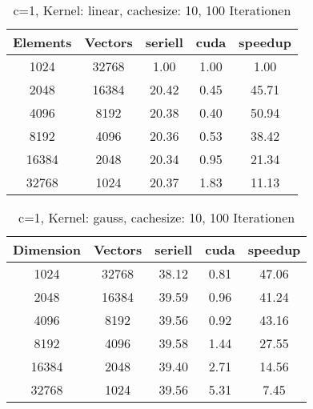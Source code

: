 \documentclass{scrartcl}
\begin{document}
\begin{table}
\begin{center}
\begin{tabular}{|c|c|c|c|c|}
\hline
Elements & Vectors & seriell & cuda & speedup \\
\hline
1024 & 32768 & 1.00 & 1.00 & 1.00 \\
2048 & 16384 & 20.42 & 0.45 & 45.71 \\
4096 & 8192 & 20.38 & 0.40 & 50.94 \\
8192 & 4096 & 20.36 & 0.53 & 38.42 \\
16384 & 2048 & 20.34 & 0.95 & 21.34 \\
32768 & 1024 & 20.37 & 1.83 & 11.13 \\
\hline
\end{tabular}
\end{center}
\caption{ c=1, Kernel: linear, cachesize: 10, 100 Iterationen}
\end{table}
\begin{table}
\begin{center}
\begin{tabular}{|c|c|c|c|c|}
\hline
Dimension & Vectors & seriell & cuda & speedup \\
\hline
1024 & 32768 & 38.12 & 0.81 & 47.06 \\
2048 & 16384 & 39.59 & 0.96 & 41.24 \\
4096 & 8192 & 39.56 & 0.92 & 43.16 \\
8192 & 4096 & 39.58 & 1.44 & 27.55 \\
16384 & 2048 & 39.40 & 2.71 & 14.56 \\
32768 & 1024 & 39.56 & 5.31 & 7.45 \\
\hline
\end{tabular}
\end{center}
\caption{ c=1, Kernel: gauss, cachesize: 10, 100 Iterationen}
\end{table}



\nocite{parallelreduction}
\nocite{interblockgpusync}
\nocite{introductiontosvm}
\nocite{diplomarbeit}
\nocite{libsvm}
\nocite{cudaprogrammingguide}


{}

\end{document}
